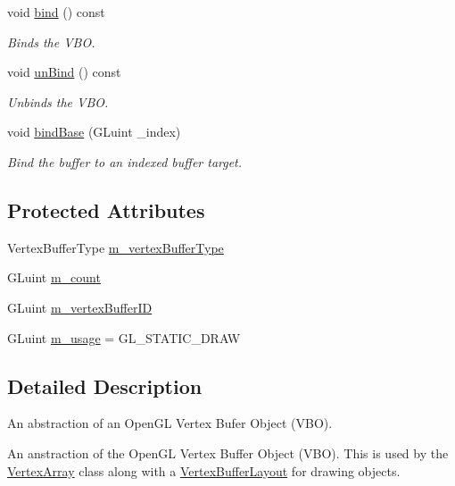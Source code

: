 \begin{DoxyCompactItemize}
void \hyperlink{class_cookie_eng_1_1_graphics_1_1_vertex_buffer_a6fbaa64c5edeb00d4f5770587eb7b369}{bind} () const
\begin{DoxyCompactList}\small\item\em Binds the V\+BO. \end{DoxyCompactList}\item 
void \hyperlink{class_cookie_eng_1_1_graphics_1_1_vertex_buffer_a8fbc3f39762c511438bc13e8c405926c}{un\+Bind} () const
\begin{DoxyCompactList}\small\item\em Unbinds the V\+BO. \end{DoxyCompactList}\item 
void \hyperlink{class_cookie_eng_1_1_graphics_1_1_vertex_buffer_a3098cec29d253dd295586fc92bc48001}{bind\+Base} (G\+Luint \+\_\+index)
\begin{DoxyCompactList}\small\item\em Bind the buffer to an indexed buffer target. \end{DoxyCompactList}\end{DoxyCompactItemize}
\subsection*{Protected Attributes}
\begin{DoxyCompactItemize}
\item 
Vertex\+Buffer\+Type \hyperlink{class_cookie_eng_1_1_graphics_1_1_vertex_buffer_a37d75d306f50db1b63c22b51912402cc}{m\+\_\+vertex\+Buffer\+Type}
\item 
G\+Luint \hyperlink{class_cookie_eng_1_1_graphics_1_1_vertex_buffer_a280a08a319717cf425435efd9b912ef3}{m\+\_\+count}
\item 
G\+Luint \hyperlink{class_cookie_eng_1_1_graphics_1_1_vertex_buffer_af4c00fbd9352dd8a0b5952c007037e2e}{m\+\_\+vertex\+Buffer\+ID}
\item 
G\+Luint \hyperlink{class_cookie_eng_1_1_graphics_1_1_vertex_buffer_a5a894fe13fdeaf0a72a20bb18ac52144}{m\+\_\+usage} = G\+L\+\_\+\+S\+T\+A\+T\+I\+C\+\_\+\+D\+R\+AW
\end{DoxyCompactItemize}


\subsection{Detailed Description}
An abstraction of an Open\+GL Vertex Bufer Object (V\+BO). 

An anstraction of the Open\+GL Vertex Buffer Object (V\+BO). This is used by the \hyperlink{class_cookie_eng_1_1_graphics_1_1_vertex_array}{Vertex\+Array} class along with a \hyperlink{class_cookie_eng_1_1_graphics_1_1_vertex_buffer_layout}{Vertex\+Buffer\+Layout} for drawing objects. 

